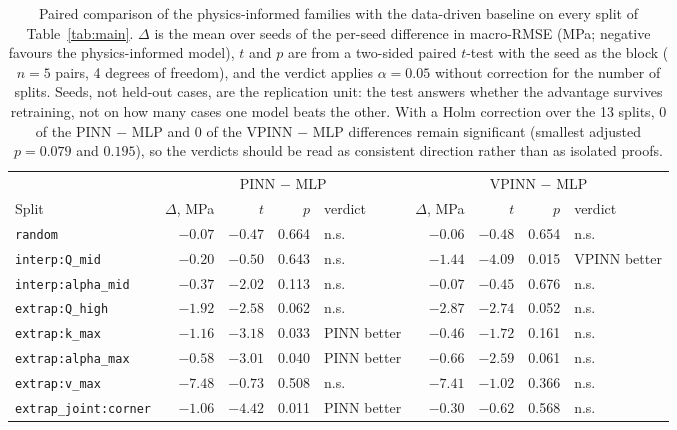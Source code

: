\begin{table}[htbp]
\centering
\caption{Paired comparison of the physics-informed families with the data-driven baseline on every split of Table~\ref{tab:main}. $\Delta$ is the mean over seeds of the per-seed difference in macro-RMSE (MPa; negative favours the physics-informed model), $t$ and $p$ are from a two-sided paired $t$-test with the seed as the block ($n = 5$ pairs, 4 degrees of freedom), and the verdict applies $\alpha = 0.05$ without correction for the number of splits. Seeds, not held-out cases, are the replication unit: the test answers whether the advantage survives retraining, not on how many cases one model beats the other. With a Holm correction over the 13 splits, 0 of the PINN $-$ MLP and 0 of the VPINN $-$ MLP differences remain significant (smallest adjusted $p = 0.079$ and $0.195$), so the verdicts should be read as consistent direction rather than as isolated proofs.}
\label{tab:paired}
\small
\begin{tabular}{@{}lrrrlrrrl@{}}
\toprule
 & \multicolumn{4}{c}{PINN $-$ MLP} & \multicolumn{4}{c}{VPINN $-$ MLP} \\
\cmidrule(lr){2-5} \cmidrule(lr){6-9}
Split & $\Delta$, MPa & $t$ & $p$ & verdict & $\Delta$, MPa & $t$ & $p$ & verdict \\
\midrule
\texttt{random} & $-0.07$ & $-0.47$ & 0.664 & n.s. & $-0.06$ & $-0.48$ & 0.654 & n.s. \\
\addlinespace
\texttt{interp:Q\_mid} & $-0.20$ & $-0.50$ & 0.643 & n.s. & $-1.44$ & $-4.09$ & 0.015 & VPINN better \\
\texttt{interp:alpha\_mid} & $-0.37$ & $-2.02$ & 0.113 & n.s. & $-0.07$ & $-0.45$ & 0.676 & n.s. \\
\addlinespace
\texttt{extrap:Q\_high} & $-1.92$ & $-2.58$ & 0.062 & n.s. & $-2.87$ & $-2.74$ & 0.052 & n.s. \\
\texttt{extrap:k\_max} & $-1.16$ & $-3.18$ & 0.033 & PINN better & $-0.46$ & $-1.72$ & 0.161 & n.s. \\
\texttt{extrap:alpha\_max} & $-0.58$ & $-3.01$ & 0.040 & PINN better & $-0.66$ & $-2.59$ & 0.061 & n.s. \\
\texttt{extrap:v\_max} & $-7.48$ & $-0.73$ & 0.508 & n.s. & $-7.41$ & $-1.02$ & 0.366 & n.s. \\
\addlinespace
\texttt{extrap\_joint:corner} & $-1.06$ & $-4.42$ & 0.011 & PINN better & $-0.30$ & $-0.62$ & 0.568 & n.s. \\

\end{tabular}
\end{table}
